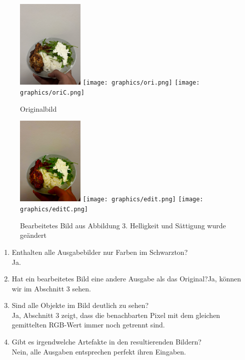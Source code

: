 \documentclass[course=asp]{aspdoc}
\begin{document}
\begin{figure}[h]
    \centering
    \includegraphics[width=3.2cm]{graphics/oricolor.JPG}
    \quad
    \texttt{[image: graphics/ori.png]}
    \quad
    \texttt{[image: graphics/oriC.png]}
    \caption{Originalbild}
    \label{fig:my_label}
\end{figure}

\begin{figure}[h]
    \centering
    \includegraphics[width=3.2cm]{graphics/editcolor.jpg}
    \quad
    \texttt{[image: graphics/edit.png]}
    \quad
    \texttt{[image: graphics/editC.png]}
    \caption{Bearbeitetes Bild aus Abbildung 3. Helligkeit und Sättigung wurde geändert}
    \label{fig:my_label}
\end{figure}

\begin{enumerate}
    \item Enthalten alle Ausgabebilder nur Farben im Schwarzton?\\Ja.
    \item Hat ein bearbeitetes Bild eine andere Ausgabe als das Original?Ja, können wir im Abschnitt 3 sehen.
    \item Sind alle Objekte im Bild deutlich zu sehen?\\Ja, Abschnitt 3 zeigt, dass die benachbarten Pixel mit dem gleichen gemittelten RGB-Wert immer noch getrennt sind.
    \item Gibt es irgendwelche Artefakte in den resultierenden Bildern?\\Nein, alle Ausgaben entsprechen perfekt ihren Eingaben.
\end{enumerate}
\end{document}
